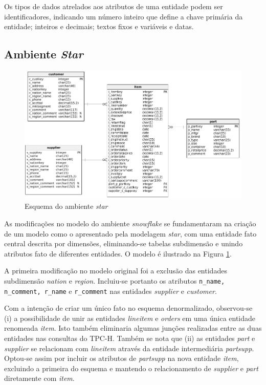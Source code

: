 \documentclass[conference]{IEEEtran}
\begin{document}
Os tipos de dados atrelados aos atributos de uma entidade podem ser identificadores, indicando um número inteiro que define a chave primária da entidade; inteiros e decimais; textos fixos e variáveis e datas.

\subsection{Ambiente \textit{Star}}
\label{sec:star}

\begin{figure}[htpb]
	\centering
		\includegraphics[width=\textwidth]{star}
	\caption{Esquema do ambiente \textit{star}}
	\label{fig:star}
\end{figure}

As modificações no modelo do ambiente \textit{snowflake} se fundamentaram na criação de um modelo como o apresentado pela modelagem \textit{star}, com uma entidade fato central descrita por dimensões, eliminando-se tabelas subdimensão e unindo atributos fato de diferentes entidades. O modelo é ilustrado na Figura \ref{fig:star}.
 
A primeira modificação no modelo original foi a exclusão das entidades subdimensão \textit{nation} e \textit{region}. Incluiu-se portanto os atributos \texttt{n\_name, n\_comment, r\_name} e \texttt{r\_comment} nas entidades \textit{supplier} e \textit{customer}. 

Com a intenção de criar um único fato no esquema denormalizado, observou-se (i) a possibilidade de unir as entidades \textit{lineitem} e \textit{orders} em uma única entidade renomeada \textit{item}. Isto também eliminaria algumas junções realizadas entre as duas entidades nas consultas do TPC-H. Também se nota que (ii) as entidades \textit{part} e \textit{supplier} se relacionam com \textit{lineitem} através da entidade intermediária \textit{partsupp}. Optou-se assim por incluir os atributos de \textit{partsupp} na nova entidade \textit{item}, excluindo a primeira do esquema e mantendo o relacionamento de \textit{supplier} e \textit{part} diretamente com \textit{item}.
\end{document}
